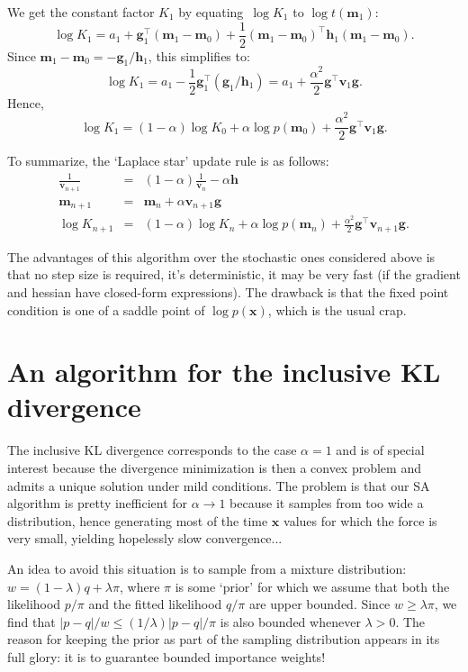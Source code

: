 \documentclass{article}
\def\x{\mathbf{x}}
\def\m{\mathbf{m}}
\def\v{\mathbf{v}}
\def\g{\mathbf{g}}
\def\h{\mathbf{h}}
\begin{document}
We get the constant factor $K_1$ by equating~$\log K_1$ to $\log t(\m_1)$:
$$
\log K_1 = a_1 + \g_1^\top (\m_1-\m_0) + \frac{1}{2}(\m_1-\m_0)^\top\h_1(\m_1-\m_0).
$$
Since $\m_1-\m_0 = -\g_1/\h_1$, this simplifies to:
$$
\log K_1 
= a_1 - \frac{1}{2}\g_1^\top (\g_1/\h_1)
= a_1 + \frac{\alpha^2}{2}\g^\top\v_1\g.
$$
Hence,
$$
\log K_1 = (1-\alpha)\log K_0 + \alpha \log p(\m_0) + \frac{\alpha^2}{2}\g^\top\v_1\g.
$$

To summarize, the `Laplace star' update rule is as follows:
\begin{eqnarray*}
\frac{1}{\v_{n+1}} & = & (1-\alpha)\frac{1}{\v_n} - \alpha\h \\
\m_{n+1} & = & \m_n + \alpha \v_{n+1} \g \\
\log K_{n+1} & = & (1-\alpha)\log K_n + \alpha \log p(\m_n) + \frac{\alpha^2}{2}\g^\top\v_{n+1}\g.
\end{eqnarray*}

The advantages of this algorithm over the stochastic ones considered above is that no step size is required, it's deterministic, it may be very fast (if the gradient and hessian have closed-form expressions). The drawback is that the fixed point condition is one of a saddle point of $\log p(\x)$, which is the usual crap. 




\section{An algorithm for the inclusive KL divergence}

The inclusive KL divergence corresponds to the case $\alpha=1$ and is of special interest because the divergence minimization is then a convex problem and admits a unique solution under mild conditions. The problem is that our SA algorithm is pretty inefficient for $\alpha\to 1$ because it samples from too wide a distribution, hence generating most of the time $\x$ values for which the force is very small, yielding hopelessly slow convergence...

An idea to avoid this situation is to sample from a mixture distribution: $w = (1-\lambda) q + \lambda\pi$, where $\pi$ is some `prior' for which we assume that both the likelihood $p/\pi$ and the fitted likelihood $q/\pi$ are upper bounded. Since $w \geq \lambda \pi$, we find that $|p-q|/w\leq (1/\lambda)|p-q|/\pi$ is also bounded whenever $\lambda>0$. The reason for keeping the prior as part of the sampling distribution appears in its full glory: it is to guarantee bounded importance weights!
\end{document}
